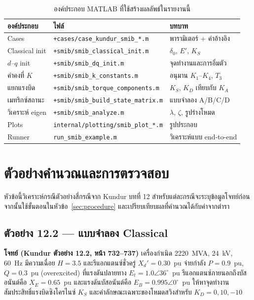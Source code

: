 \documentclass[12pt,a4paper]{article}
\begin{document}
\begin{table}[H]
\centering
\caption{องค์ประกอบ MATLAB ที่ใช้สร้างผลลัพธ์ในรายงานนี้}
\label{tab:impl}
\begin{tabular}{@{}lll@{}}
\toprule
องค์ประกอบ & ไฟล์ & บทบาท \\
\midrule
Cases          & \texttt{+cases/case\_kundur\_smib\_*.m} & พารามิเตอร์ + ค่าอ้างอิง \\
Classical init & \texttt{+smib/smib\_classical\_init.m}  & $\delta_0$, $E'$, $K_S$ \\
$d$--$q$ init  & \texttt{+smib/smib\_dq\_init.m}         & จุดทำงานและการอิ่มตัว \\
ค่าคงที่ $K$  & \texttt{+smib/smib\_k\_constants.m}     & อนุมาน $K_1$--$K_4$, $T_3$ \\
แยกแรงบิด     & \texttt{+smib/smib\_torque\_components.m} & $K_S$, $K_D$ เทียบกับ $K_A$ \\
เมทริกซ์สถานะ & \texttt{+smib/smib\_build\_state\_matrix.m} & แบบจำลอง A/B/C/D \\
วิเคราะห์ eigen & \texttt{+smib/smib\_analyze.m}          & $\lambda$, $\zeta$, รูปร่างโหมด \\
Plots          & \texttt{internal/plotting/smib\_plot\_*.m} & รูปประกอบ \\
Runner         & \texttt{run\_smib\_example.m}           & วิเคราะห์แบบ end-to-end \\
\bottomrule
\end{tabular}
\end{table}

\section{ตัวอย่างคำนวณและการตรวจสอบ}

หัวข้อนี้วิเคราะห์กรณีตัวอย่างสี่กรณีจาก Kundur บทที่ 12
สำหรับแต่ละกรณีจะระบุข้อมูลโจทย์ก่อน จากนั้นใช้ขั้นตอนในหัวข้อ~\ref{sec:procedure}
และเปรียบเทียบผลที่คำนวณได้กับค่าจากตำรา

\subsection{ตัวอย่าง 12.2 --- แบบจำลอง Classical}

\textbf{โจทย์ (Kundur ตัวอย่าง 12.2, หน้า 732--737)}
เครื่องกำเนิด 2220~MVA, 24~kV, 60~Hz มีความเฉื่อย $H=3.5$
และรีแอกแตนซ์ชั่วครู่ $X_d'=0.30$~pu จ่ายกำลัง $P=0.9$~pu, $Q=0.3$~pu
(overexcited) ที่แรงดันปลายทาง $E_t = 1.0\angle 36^\circ$~pu
รีแอกแตนซ์ภายนอกถึงบัสอนันต์คือ $X_E = 0.65$~pu
และแรงดันบัสอนันต์คือ $E_B = 0.995\angle 0^\circ$~pu
ให้หาจุดทำงาน สัมประสิทธิ์แรงบิดซิงโครไนซ์ $K_S$
และค่าลักษณะเฉพาะของโหมดสวิงสำหรับ $K_D = 0, 10, -10$
\end{document}
